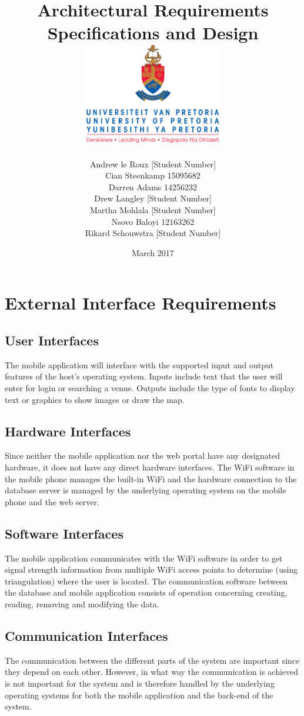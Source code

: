 \documentclass{article}
\title{ Architectural Requirements Specifications and Design \\[0.5cm] \includegraphics[width=6cm]{front-page}}
\author{Andrew le Roux \hfill [Student Number] \\ Cian Steenkamp \hfill 15095682 \\ Darren Adams \hfill 14256232 \\ Drew Langley \hfill [Student Number] \\ Martha Mohlala \hfill [Student Number] \\ Nsovo Baloyi \hfill 12163262 \\ Rikard Schouwstra \hfill [Student Number]}
\date{March 2017}
\begin{document}
\maketitle
\pagebreak
\tableofcontents
\pagebreak

\section{External Interface Requirements}
    \subsection{User Interfaces}
        The mobile application will interface with the supported input and output
        features of the host's operating system. Inputs include text that the user
        will enter for login or searching a venue. Outputs include the type of fonts
        to display text or graphics to show images or draw the map.

    \subsection{Hardware Interfaces}
        Since neither the mobile application nor the web portal have any designated
        hardware, it does not have any direct hardware interfaces. The WiFi software
        in the mobile phone manages the built-in WiFi and the hardware connection
        to the database server is managed by the underlying operating system on the
        mobile phone and the web server.

    \subsection{Software Interfaces}
        The mobile application communicates with the WiFi software in order to get
        signal strength information from multiple WiFi access points to determine
        (using triangulation) where the user is located. The communication software
        between the database and mobile application consists of operation concerning
        creating, reading, removing and modifying the data.

    \subsection{Communication Interfaces}
        The communication between the different parts of the system are important since they depend on each other. However, in what way the communication is achieved is not important for the system and is therefore handled by the underlying operating systems for both the mobile application and the back-end of the system.
\end{document}

